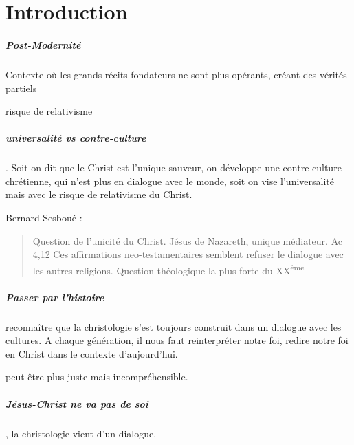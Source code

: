 \chapter{Introduction}

\paragraph{Post-Modernité}
\begin{Def}
Contexte où les grands récits fondateurs ne sont plus opérants, créant des vérités partiels
\end{Def}

risque de relativisme


\paragraph{universalité vs contre-culture}. Soit on dit que le Christ est l'unique sauveur, on développe une contre-culture chrétienne, qui n'est plus en dialogue avec le monde, soit on vise l'universalité mais avec le risque de relativisme du Christ.


Bernard Sesboué  :
\begin{quote}
    Question de l'unicité du Christ. Jésus de Nazareth, unique médiateur.
    Ac 4,12
    Ces affirmations neo-testamentaires semblent refuser le dialogue avec les autres religions.
    Question théologique la plus forte du XX\textsuperscript{ème}
\end{quote}

\paragraph{Passer par l'histoire} reconnaître que la christologie s'est toujours construit dans un dialogue avec les cultures. A chaque génération, il nous faut reinterpréter notre foi, redire notre foi en Christ dans le contexte d'aujourd'hui.

\begin{Ex}[Consubstantiel]
peut être plus juste mais incompréhensible.
\end{Ex}

\paragraph{Jésus-Christ ne va pas de soi}, la christologie vient d'un dialogue.

